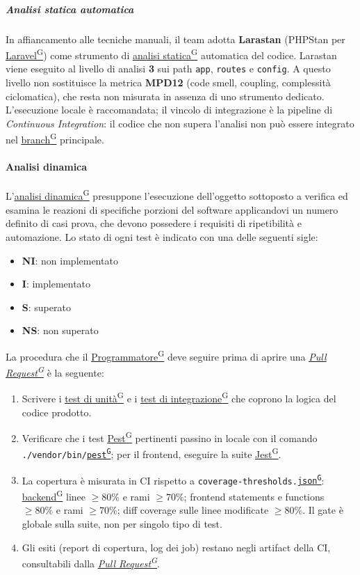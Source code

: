\documentclass[a4paper,12pt]{article}
\providecommand{\glslink}[2]{\href{https://alittlebyte-19.github.io/Documentazione/glossario.html\#gls-#1}{\underline{#2}\textsuperscript{\scriptsize G}}}
\begin{document}
\subparagraph{Analisi statica automatica}
In affiancamento alle tecniche manuali, il team adotta \textbf{Larastan} (PHPStan per \glslink{laravel}{Laravel}) come strumento di \glslink{analisi-statica}{analisi statica} automatica del codice. Larastan viene eseguito al livello di analisi \textbf{3} sui path \texttt{app}, \texttt{routes} e \texttt{config}. A questo livello non sostituisce la metrica \textbf{MPD12} (code smell, coupling, complessità ciclomatica), che resta non misurata in assenza di uno strumento dedicato. L'esecuzione locale è raccomandata; il vincolo di integrazione è la pipeline di \textit{Continuous Integration}: il codice che non supera l'analisi non può essere integrato nel \glslink{branch}{branch} principale.

\paragraph{Analisi dinamica}
L'\glslink{analisi-dinamica}{analisi dinamica} presuppone l'esecuzione dell'oggetto sottoposto a verifica ed esamina le reazioni di specifiche porzioni del software applicandovi un numero definito di casi prova, che devono possedere i requisiti di ripetibilità e automazione. Lo stato di ogni test è indicato con una delle seguenti sigle:

\begin{itemize}
    \item \textbf{NI}: non implementato
    \item \textbf{I}: implementato
    \item \textbf{S}: superato
    \item \textbf{NS}: non superato
\end{itemize}

La procedura che il \glslink{programmatore}{Programmatore} deve seguire prima di aprire una \textit{\glslink{pull-request}{Pull Request}} è la seguente:

\begin{enumerate}
    \item Scrivere i \glslink{test-di-unita}{test di unità} e i \glslink{test-di-integrazione}{test di integrazione} che coprono la logica del codice prodotto.
    \item Verificare che i test \glslink{pest}{Pest} pertinenti passino in locale con il comando \texttt{./vendor/bin/\glslink{pest}{pest}}; per il frontend, eseguire la suite \glslink{jest}{Jest}.
    \item La copertura è misurata in CI rispetto a \texttt{coverage-thresholds.\glslink{json}{json}}: \glslink{backend}{backend} linee $\geq 80\%$ e rami $\geq 70\%$; frontend statements e functions $\geq 80\%$ e rami $\geq 70\%$; diff coverage sulle linee modificate $\geq 80\%$. Il gate è globale sulla suite, non per singolo tipo di test.
    \item Gli esiti (report di copertura, log dei job) restano negli artifact della CI, consultabili dalla \textit{\glslink{pull-request}{Pull Request}}.
\end{enumerate}
\end{document}
